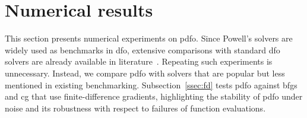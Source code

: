 \documentclass[
    smallextended,  %
    final,          %
]{svjour3}
\newcommand{\rad}[1][k]{\Delta\ifthenelse{\equal{#1}{}}{}{_{#1}}}
\begin{document}


\section{Numerical results}
\label{sec:numerical}

This section presents numerical experiments on \gls{pdfo}.
Since Powell's solvers are widely used as benchmarks in \gls{dfo},
extensive comparisons with standard \gls{dfo} solvers are
already available in literature~\cite{More_Wild_2009,Rios_Sahinidis_2013}.
Repeating such experiments is unnecessary. Instead, we compare \gls{pdfo} with solvers that
are popular but less mentioned in existing benchmarking.
Subsection~\ref{ssec:fd} tests \gls{pdfo} against \gls{bfgs} and \gls{cg} that use finite-difference gradients,
highlighting the stability of \gls{pdfo} under noise and its robustness with respect to failures of
function evaluations.
\end{document}
